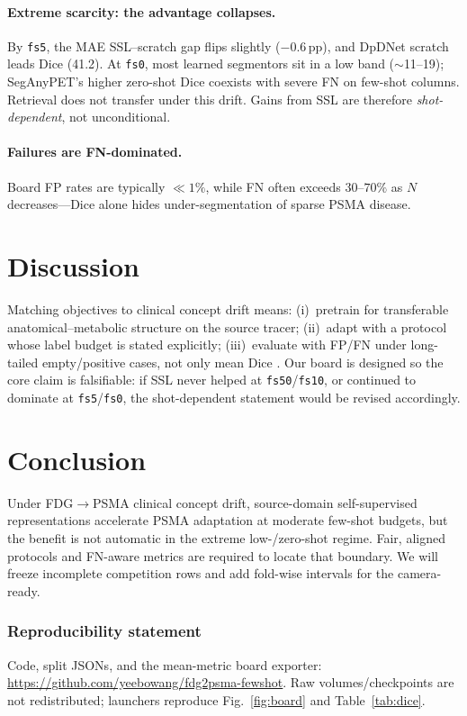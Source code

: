\documentclass{article} %
\begin{document}
\paragraph{Extreme scarcity: the advantage collapses.}
By \texttt{fs5}, the MAE SSL--scratch gap flips slightly ($-0.6$\,pp), and DpDNet
scratch leads Dice (41.2). At \texttt{fs0}, most learned segmentors sit in a low
band ($\sim$11--19); SegAnyPET's higher zero-shot Dice coexists with severe FN on
few-shot columns. Retrieval does not transfer under this drift. Gains from SSL are
therefore \emph{shot-dependent}, not unconditional.

\paragraph{Failures are FN-dominated.}
Board FP rates are typically $\ll 1\%$, while FN often exceeds $30$--$70\%$ as $N$
decreases---Dice alone hides under-segmentation of sparse PSMA disease.

\section{Discussion}
\label{sec:discussion}

Matching objectives to clinical concept drift means: (i)~pretrain for transferable
anatomical--metabolic structure on the source tracer; (ii)~adapt with a protocol
whose label budget is stated explicitly; (iii)~evaluate with FP/FN under
long-tailed empty/positive cases, not only mean Dice
\citep{bercea2025normative,bercea2025nova}.
Our board is designed so the core claim is falsifiable: if SSL never helped at
\texttt{fs50}/\texttt{fs10}, or continued to dominate at \texttt{fs5}/\texttt{fs0},
the shot-dependent statement would be revised accordingly.

\section{Conclusion}
\label{sec:conclusion}

Under FDG$\rightarrow$PSMA clinical concept drift, source-domain self-supervised
representations accelerate PSMA adaptation at moderate few-shot budgets, but the benefit is
not automatic in the extreme low-/zero-shot regime. Fair, aligned protocols and
FN-aware metrics are required to locate that boundary. We will freeze incomplete
competition rows and add fold-wise intervals for the camera-ready.

\subsubsection*{Reproducibility statement}
Code, split JSONs, and the mean-metric board exporter:
\url{https://github.com/yeebowang/fdg2psma-fewshot}.
Raw volumes/checkpoints are not redistributed; launchers reproduce
Fig.~\ref{fig:board} and Table~\ref{tab:dice}.
\end{document}
